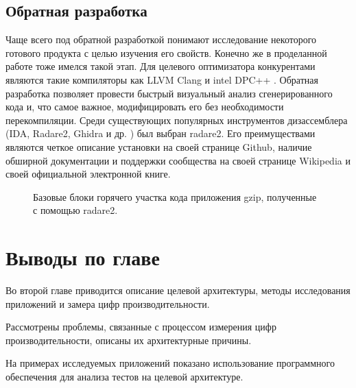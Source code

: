 \subsection{Обратная разработка}\label{p1:optop:reverse}

Чаще всего под обратной разработкой понимают исследование некоторого готового продукта с целью изучения его свойств. Конечно же в проделанной работе тоже имелся такой этап. Для целевого оптимизатора конкурентами являются такие компиляторы как LLVM Clang \cite{lattner2008llvm} и intel DPC++ \cite{castano2022evaluation}. Обратная разработка позволяет провести быстрый визуальный анализ сгенерированного кода и, что самое важное,  модифицировать его без необходимости перекомпиляции. Среди существующих популярных инструментов дизассемблера (IDA, Radare2, Ghidra и др. \cite{ferguson2008reverse, mester2023malware, jiang2022comprehensive}) был выбран radare2. Его преимуществами являются четкое описание установки на своей странице Github, наличие обширной документации и поддержки сообщества на своей странице Wikipedia и своей официальной электронной книге.

\begin{figure}[htbp]
	\centering
	
	\caption{Базовые блоки горячего участка кода приложения gzip, полученные с помощью radare2.}
	\label{radare2}
\end{figure}

\section{Выводы по главе}

Во второй главе приводится описание целевой архитектуры,  методы исследования приложений и замера цифр производительности. 

Рассмотрены проблемы, связанные с процессом измерения цифр производительности, описаны их архитектурные причины.

На примерах исследуемых приложений показано использование программного обеспечения для анализа тестов на целевой архитектуре.



